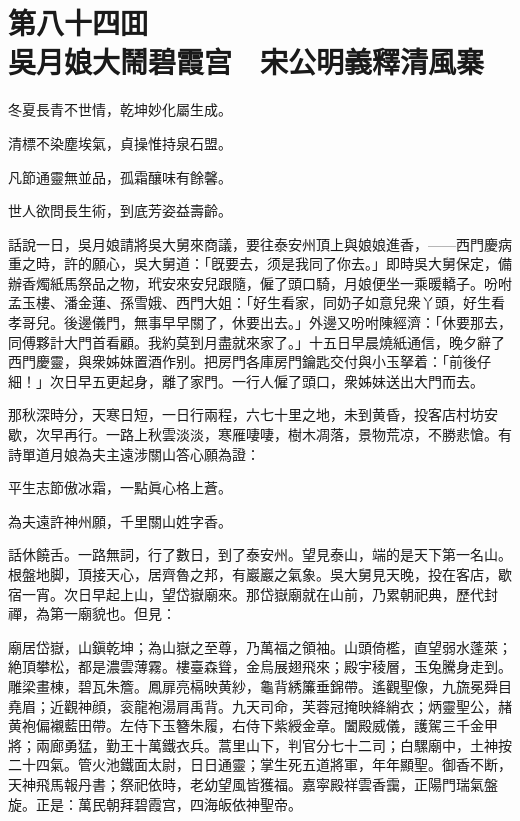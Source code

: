 
\chapter*{第八十四囬　\\吳月娘大鬧碧霞宫　宋公明義釋清風寨}


\begin{myquote}
冬夏長青不世情，乾坤妙化屬生成。

清標不染塵埃氣，貞操惟持泉石盟。

凡節通靈無並品，孤霜釀味有餘馨。

世人欲問長生術，到底芳姿益壽齡。
\end{myquote}

話說一日，吳月娘請將吳大舅來商議，要往泰安州頂上與娘娘進香，——西門慶病重之時，許的願心，吳大舅道：「旣要去，须是我同了你去。」即時吳大舅保定，備辦香燭紙馬祭品之物，玳安來安兒跟隨，僱了頭口騎，月娘便坐一乘暖轎子。吩咐孟玉樓、潘金蓮、孫雪娥、西門大姐：「好生看家，同奶子如意兒衆丫頭，好生看孝哥兒。後邊儀門，無事早早關了，休要出去。」外邊又吩咐陳經濟：「休要那去，同傅夥計大門首看顧。我約莫到月盡就來家了。」十五日早晨燒紙通信，晚夕辭了西門慶靈，與衆姊妹置酒作别。把房門各庫房門鑰匙交付與小玉拏着：「前後仔細！」次日早五更起身，離了家門。一行人僱了頭口，衆姊妹送出大門而去。

那秋深時分，天寒日短，一日行兩程，六七十里之地，未到黄昏，投客店村坊安歇，次早再行。一路上秋雲淡淡，寒雁啛啛，樹木凋落，景物荒凉，不勝悲愴。有詩單道月娘為夫主遠涉關山答心願為證：

\begin{myquote}
平生志節傲冰霜，一點眞心格上蒼。

為夫遠許神州願，千里關山姓字香。
\end{myquote}

話休饒舌。一路無詞，行了數日，到了泰安州。望見泰山，端的是天下第一名山。根盤地脚，頂接天心，居齊魯之邦，有巖巖之氣象。吳大舅見天晚，投在客店，歇宿一宵。次日早起上山，望岱嶽廟來。那岱嶽廟就在山前，乃累朝祀典，歷代封禪，為第一廟貌也。但見：

\begin{myquote}
廟居岱嶽，山鎭乾坤；為山嶽之至尊，乃萬福之領袖。山頭倚檻，直望弱水蓬萊；絶頂攀松，都是濃雲薄霧。樓臺森聳，金烏展翅飛來；殿宇稜層，玉兔騰身走到。雕梁畫棟，碧瓦朱簷。鳳扉亮槅映黄紗，龜背綉簾垂錦帶。遙觀聖像，九旒冕舜目堯眉；近觀神顔，衮龍袍湯肩禹背。九天司命，芙蓉冠掩映絳綃衣；炳靈聖公，赭黄袍偏襯藍田帶。左侍下玉簪朱履，右侍下紫綬金章。闔殿威儀，護駕三千金甲將；兩廊勇猛，勤王十萬鐵衣兵。蒿里山下，判官分七十二司；白騾廟中，土神按二十四氣。管火池鐵面太尉，日日通靈；掌生死五道將軍，年年顯聖。御香不断，天神飛馬報丹書；祭祀依時，老幼望風皆獲福。嘉寜殿祥雲香靄，正陽門瑞氣盤旋。正是：萬民朝拜碧霞宫，四海皈依神聖帝。
\end{myquote}

